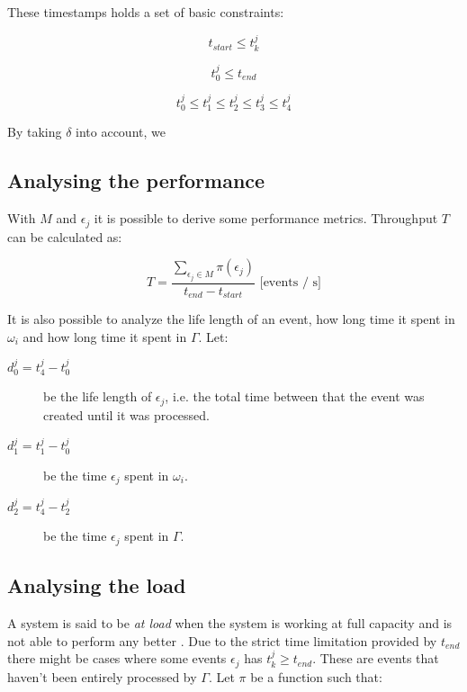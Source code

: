 These timestamps holds a set of basic constraints:

\begin{equation}
t_{start} \leq t_k^j
\end{equation}

\begin{equation}
t_0^j \leq t_{end}
\end{equation}

\begin{equation}
t_0^j \leq t_1^j \leq t_2^j \leq t_3^j \leq t_4^j
\end{equation}

By taking $\delta$ into account, we


\subsection{Analysing the performance}

With $M$ and $\epsilon_j$ it is possible to derive some performance metrics.
Throughput $T$ can be calculated as:

$$
T = \frac{\sum_{\epsilon_j \in M}{\pi(\epsilon_j)}}{t_{end} - t_{start}}
\text{ [events / s]}
$$

It is also possible to analyze the life length of an event, how long time it
spent in $\omega_i$ and how long time it spent in $\Gamma$. Let:

\begin{description}
    \item[$d_0^j = t_4^j - t_0^j$] be the life length of $\epsilon_j$, i.e. the
        total time between that the event was created until it was processed.
    \item[$d_1^j = t_1^j - t_0^j$] be the time $\epsilon_j$ spent in
        $\omega_i$.
    \item[$d_2^j = t_4^j - t_2^j$] be the time $\epsilon_j$ spent in
        $\Gamma$.
\end{description}

\subsection{Analysing the load}

A system is said to be \textit{at load} when the system is working at full
capacity and is not able to perform any better . Due to the
strict time limitation provided by $t_{end}$ there might be cases where some
events $\epsilon_j$ has $t_k^j \geq t_{end}$. These are events that haven't
been entirely processed by $\Gamma$. Let $\pi$ be a function such that:

